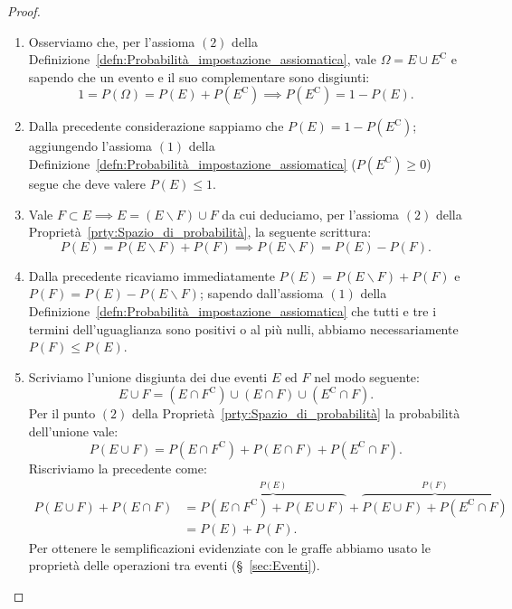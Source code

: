 \documentclass[12pt,openany]{amsbook}
\theoremstyle{plain}
\numberwithin{equation}{section} %
\theoremstyle{definition}
\begin{document}
            \begin{proof}
                \hfill
                \begin{enumerate}
                    \item Osserviamo che, per l'assioma $(2)$ della Definizione~\ref{defn:Probabilità_impostazione_assiomatica}, vale $\Omega = E \cup E^{\text{C}}$ e sapendo che un evento e il suo complementare sono disgiunti: \[
                        1 = P(\Omega)= P(E) + P(E^{\text{C}}) \implies P(E^{\text{C}}) = 1 - P(E)
                    .\] 
                    \item Dalla precedente considerazione sappiamo che $P(E) = 1 - P(E^{\text{C}})$; aggiungendo l'assioma $(1)$ della Definizione~\ref{defn:Probabilità_impostazione_assiomatica} ($P(E^{\text{C}}) \geq 0$) segue che deve valere $P(E) \leq 1$.
                    \item Vale $F \subset E \implies E = (E \backslash F) \cup F$ da cui deduciamo, per l'assioma $(2)$ della Proprietà~\ref{prty:Spazio_di_probabilità}, la seguente scrittura: \[
                        P(E) = P(E \backslash F) + P(F) \implies P(E \backslash F) = P(E) - P(F)
                    .\] 
                    \item Dalla precedente ricaviamo immediatamente $P(E) = P(E \backslash F) + P(F)$ e  $P(F) = P(E) - P(E \backslash F)$; sapendo dall'assioma $(1)$ della Definizione~\ref{defn:Probabilità_impostazione_assiomatica} che tutti e tre i termini dell'uguaglianza sono positivi o al più nulli, abbiamo necessariamente $P(F) \leq P(E)$.
                    \item Scriviamo l'unione disgiunta dei due eventi $E$ ed  $F$ nel modo seguente:  \[
                        E \cup F = (E \cap F^{\text{C}}) \cup (E \cap F) \cup (E^{\text{C}} \cap F)
                    .\] Per il punto $(2)$ della Proprietà~\ref{prty:Spazio_di_probabilità} la probabilità dell'unione vale: \[
                        P(E \cup F) = P(E \cap F^{\text{C}}) + P(E \cap F) + P(E^{\text{C}} \cap F)
                    .\] Riscriviamo la precedente come:
                    \begin{align*}
                        P(E \cup F) + P(E \cap F) &= \overset{P(E)}{\overbrace{P(E \cap F^{\text{C}}) + P(E \cup F)}} + \overset{P(F)}{\overbrace{P(E \cup F) + P(E^{\text{C}} \cap F)}} \\ {}&= P(E) + P(F)
                    .
                    \end{align*}
                    Per ottenere le semplificazioni evidenziate con le graffe abbiamo usato le proprietà delle operazioni tra eventi (§~\ref{sec:Eventi}). \qedhere
                \end{enumerate}
            \end{proof}
\end{document}
